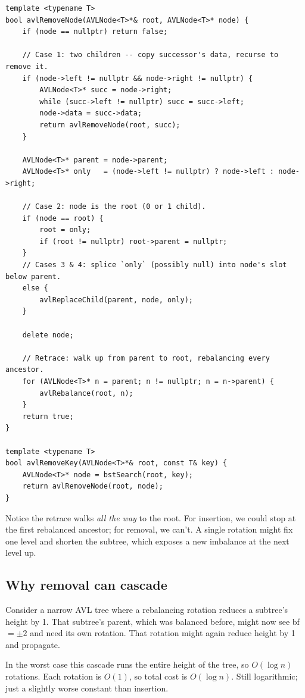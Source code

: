 \documentclass[11pt]{article}
\begin{document}
\begin{lstlisting}
template <typename T>
bool avlRemoveNode(AVLNode<T>*& root, AVLNode<T>* node) {
    if (node == nullptr) return false;

    // Case 1: two children -- copy successor's data, recurse to remove it.
    if (node->left != nullptr && node->right != nullptr) {
        AVLNode<T>* succ = node->right;
        while (succ->left != nullptr) succ = succ->left;
        node->data = succ->data;
        return avlRemoveNode(root, succ);
    }

    AVLNode<T>* parent = node->parent;
    AVLNode<T>* only   = (node->left != nullptr) ? node->left : node->right;

    // Case 2: node is the root (0 or 1 child).
    if (node == root) {
        root = only;
        if (root != nullptr) root->parent = nullptr;
    }
    // Cases 3 & 4: splice `only` (possibly null) into node's slot below parent.
    else {
        avlReplaceChild(parent, node, only);
    }

    delete node;

    // Retrace: walk up from parent to root, rebalancing every ancestor.
    for (AVLNode<T>* n = parent; n != nullptr; n = n->parent) {
        avlRebalance(root, n);
    }
    return true;
}

template <typename T>
bool avlRemoveKey(AVLNode<T>*& root, const T& key) {
    AVLNode<T>* node = bstSearch(root, key);
    return avlRemoveNode(root, node);
}
\end{lstlisting}

Notice the retrace walks \emph{all the way} to the root. For insertion, we could stop at the first rebalanced ancestor; for removal, we can't. A single rotation might fix one level and shorten the subtree, which exposes a new imbalance at the next level up.

\subsection*{Why removal can cascade}

\begin{center}
Consider a narrow AVL tree where a rebalancing rotation reduces a subtree's height by 1. That subtree's parent, which was balanced before, might now see bf $= \pm 2$ and need its own rotation. That rotation might again reduce height by 1 and propagate.
\end{center}

In the worst case this cascade runs the entire height of the tree, so $O(\log n)$ rotations. Each rotation is $O(1)$, so total cost is $O(\log n)$. Still logarithmic; just a slightly worse constant than insertion.
\end{document}

